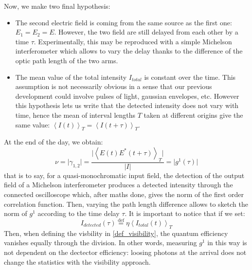 \documentclass[11pt]{report}
\begin{document}
Now, we make two final hypothesis:
\begin{itemize}
	\item The second electric field is coming from the same source as the first one: $E_1 = E_2 = E$. However, the two field are still delayed from each other by a time $\tau$. Experimentally, this may be reproduced with a simple Michelson interferometer which allows to vary the delay thanks to the difference of the optic path length of the two arms.
	\item The mean value of the total intensity $I_{total}$ is constant over the time. This assumption is not necessarily obvious in a sense that our previous development could involve pulses of light, gaussian envelopes, etc. However this hypothesis lets us write that the detected intensity does not vary with time, hence the mean of interval lengths $T$ taken at  different origins give the same value: $\left\langle I(t) \right\rangle_T = \left\langle I(t + \tau) \right\rangle _T$.
\end{itemize}
At the end of the day, we obtain:
\begin{equation}
\nu = \vert \gamma_{1, 2} \vert = \frac{\vert\left\langle E(t) E^*(t + \tau) \right\rangle _T\vert}{\vert I \vert} = \vert g^1(\tau) \vert
\end{equation}
that is to say, for a quasi-monochromatic input field, the detection of the output field of a Michelson interferometer produces a detected intensity through the connected oscilloscope which, after maths done, gives the norm of the first order correlation function. Then, varying the path length difference allows to sketch the norm of $g^1$ according to the time delay $\tau$. It is important to notice that if we set:
\begin{equation}
I_{detected}(\tau) \stackrel{\text{def}}{=} \eta \left\langle I_{total}(t) \right\rangle_T
\end{equation}
Then, when defining the visbility in \eqref{def_visibility}, the quantum efficiency vanishes equally through the division. In other words, measuring $g^1$ in this way is not dependent on the dectector efficiency: loosing photons at the arrival does not change the statistics with the visibility approach.
\end{document}
